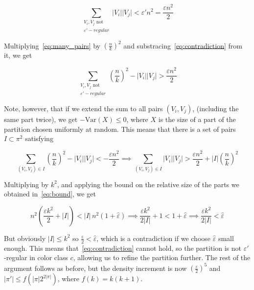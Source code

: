\documentclass{amsart}
\theoremstyle{plain}
\theoremstyle{definition}
\begin{document}
    \begin{equation}\label{eq:contradiction}
        \sum_{\substack{V_i, V_j \text{ not } \\ \varepsilon'-regular}} \lvert V_i \rvert \lvert V_j \rvert < \varepsilon' n^2 = \frac{\varepsilon n^2}{2}
    \end{equation}

    Multiplying~\eqref{eq:many_pairs} by $\left(\frac{n}{k}\right)^2$ and substracing~\eqref{eq:contradiction} from it, we get

    \begin{equation}\label{eq:combined}
        \sum_{\substack{V_i, V_j \text{ not } \\ \varepsilon'-regular}} \left( \frac{n}{k} \right)^2 - \lvert V_i \rvert \lvert V_j \rvert > \frac{\varepsilon n^2}{2}
    \end{equation}

    Note, however, that if we extend the sum to all pairs $(V_i, V_j)$, (including the same part twice), we get $-\text{Var}(X) \leq 0$,
    where $X$ is the size of a part of the partition chosen uniformly at random.
    This means that there is a set of pairs $I \subset \pi^2$ satisfying

    \begin{equation*}\label{eq:others}
        \sum_{(V_i, V_j) \in I} \left( \frac{n}{k} \right)^2 - \lvert V_i \rvert \lvert V_j \rvert <  - \frac{\varepsilon n^2}{2}
        \implies \sum_{(V_i, V_j) \in I} \lvert V_i \rvert \lvert V_j \rvert > \frac{\varepsilon n^2}{2} + \lvert I \rvert \left( \frac{n}{k} \right)^2
    \end{equation*}

    Multiplying by $k^2$, and applying the bound on the relative size of the parts we obtained in~\eqref{eq:bound}, we get

    \begin{equation*}\label{eq:equation}
        n^2 \left( \frac{\varepsilon k^2}{2} + \lvert I \rvert \right) < \lvert I \rvert \, n^2 \left( 1 + \hat{\varepsilon} \right)
        \implies \frac{\varepsilon k^2}{2 \lvert I \rvert} + 1 < 1 + \hat{\varepsilon}
        \implies \frac{\varepsilon k^2}{2 \lvert I \rvert} < \hat{\varepsilon}
    \end{equation*}

    But obviously $\lvert I \rvert \leq k^2$ so $\frac{\varepsilon}{2} < \hat{\varepsilon}$, which is a contradiction
    if we choose $\hat{\varepsilon}$ small enough.
    This means that~\eqref{eq:contradiction} cannot hold,
    so the partition is not $\varepsilon'$-regular in color class $c$, allowing us to refine
    the partition further.
    The rest of the argument follows as before, but the density increment is now $(\frac{\varepsilon}{2})^5$
    and $\lvert \pi' \rvert \leq f\left( \lvert \pi \rvert 2^{2 \lvert \pi \rvert}\right)$,
    where $f(k) = k(k+1)$.
\end{document}
